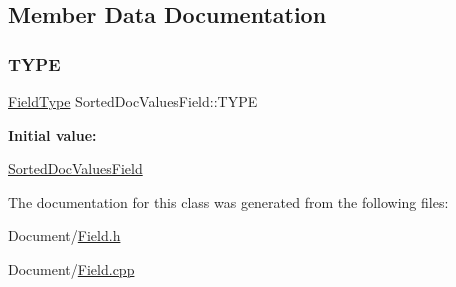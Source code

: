 \subsection{Member Data Documentation}
\mbox{\label{classlucene_1_1core_1_1document_1_1SortedDocValuesField_ae6962eedda0d777922501ab86f1728f1}} 
\subsubsection{\texorpdfstring{T\+Y\+PE}{TYPE}}
{\footnotesize\ttfamily \mbox{\hyperlink{classlucene_1_1core_1_1document_1_1FieldType}{Field\+Type}} Sorted\+Doc\+Values\+Field\+::\+T\+Y\+PE\hspace{0.3cm}{\ttfamily [static]}}

{\bfseries Initial value\+:}
\begin{DoxyCode}
\DoxyCodeLine{= []() \{}
\DoxyCodeLine{\}()}
\end{DoxyCode}
\mbox{\hyperlink{classlucene_1_1core_1_1document_1_1SortedDocValuesField}{Sorted\+Doc\+Values\+Field}} 

The documentation for this class was generated from the following files\+:\begin{DoxyCompactItemize}
\item 
Document/\mbox{\hyperlink{Document_2Field_8h}{Field.\+h}}\item 
Document/\mbox{\hyperlink{Field_8cpp}{Field.\+cpp}}\end{DoxyCompactItemize}
